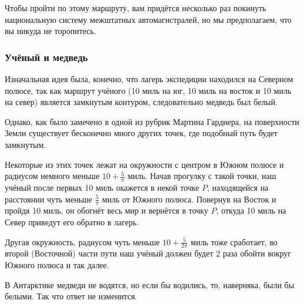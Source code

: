 Чтобы пройти по этому маршруту, вам придётся несколько раз %
покинуть национальную систему межштатных автомагистралей, но мы предполагаем, что вы никуда не торопитесь.

\subsubsection*{Учёный и медведь}%

Изначальная идея была, конечно, что лагерь экспедиции находился на Северном полюсе, так как маршрут учёного (10 миль на юг, 10 миль на восток и 10 миль на север) является замкнутым контуром, %
следовательно медведь был белый.

Однако, как было замечено в одной из рубрик %
Мартина Гарднера, %
на поверхности Земли существует бесконечно много других точек, где подобный путь будет замкнутым.

Некоторые из этих точек лежат на окружности с центром в Южном полюсе и радиусом немного меньше $10 + \tfrac5\pi$ миль.
Начав прогулку с такой точки, наш учёный после первых 10 миль окажется в некой точке $P$, 
находящейся на расстоянии чуть меньше $\tfrac5\pi$ миль от Южного полюса.
Повернув на Восток и пройдя 10 миль, он обогнёт весь мир и вернётся в точку $P$, откуда 10 миль на Север приведут его обратно в лагерь.

Другая окружность, радиусом чуть меньше $10 + \tfrac5{2\pi}$ миль тоже сработает, во второй (Восточной) части пути наш учёный должен будет 2 раза обойти вокруг Южного полюса и так далее.

В Антарктике медведи не водятся, но если бы водились, то, наверняка, были бы белыми.
Так что ответ не изменится.\heart
